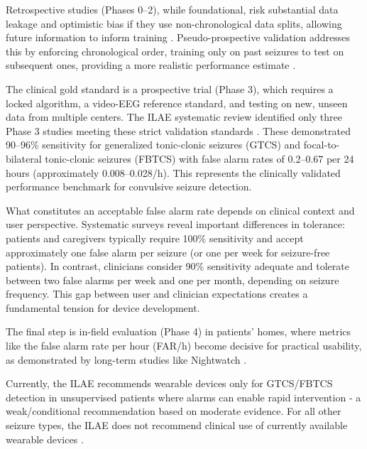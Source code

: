 Retrospective studies (Phases 0--2), while foundational,
risk substantial data leakage and optimistic bias if they use non-chronological data splits,
allowing future information to inform training
\parencite{kalousiosECGbasedEpilepticSeizure2024, wongEEGDatasetsSeizure2023}.
Pseudo-prospective validation addresses this by enforcing chronological order,
training only on past seizures to test on subsequent ones,
providing a more realistic performance estimate
\parencite{kalousiosECGbasedEpilepticSeizure2024, luLeveragingChannelCoherence2025}.

The clinical gold standard is a prospective trial (Phase 3),
which requires a locked algorithm, a video-EEG reference standard,
and testing on new, unseen data from multiple centers.
The ILAE systematic review identified only three Phase 3 studies meeting these strict validation standards
\parencite{beniczkyAutomatedSeizureDetection2021}.
These demonstrated 90--96\% sensitivity for generalized tonic-clonic seizures (GTCS) and focal-to-bilateral tonic-clonic seizures (FBTCS) with false alarm rates of 0.2--0.67 per 24 hours (approximately 0.008--0.028/h). This represents the clinically validated performance benchmark for convulsive seizure detection.

What constitutes an acceptable false alarm rate depends on clinical context and user perspective. Systematic surveys reveal important differences in tolerance: patients and caregivers typically require 100\% sensitivity and accept approximately one false alarm per seizure (or one per week for seizure-free patients). In contrast, clinicians consider 90\% sensitivity adequate and tolerate between two false alarms per week and one per month, depending on seizure frequency. This gap between user and clinician expectations creates a fundamental tension for device development.

The final step is in-field evaluation (Phase 4) in patients' homes,
where metrics like the false alarm rate per hour (FAR/h) become decisive for practical usability,
as demonstrated by long-term studies like Nightwatch
\parencite{mironAutonomicBiosignalsSeizure2025, shumCommerciallyAvailableSeizure2021}.

Currently, the ILAE recommends wearable devices only for GTCS/FBTCS detection in unsupervised patients where alarms can enable rapid intervention - a weak/conditional recommendation based on moderate evidence. For all other seizure types, the ILAE does not recommend clinical use of currently available wearable devices
\parencite{beniczkyAutomatedSeizureDetection2021}.